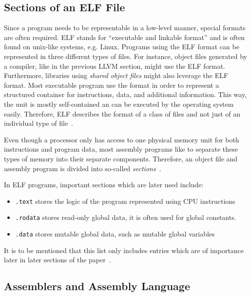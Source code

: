 \subsection{Sections of an ELF File}
Since a program needs to be representable in a low-level manner, special formats are often required.
ELF stands for \enquote{executable and linkable format} and is often found on unix-like systems, e.g. Linux.
Programs using the ELF format can be represented in three different types of files.
For instance, object files generated by a compiler, like in the previous LLVM section, might use the ELF format.
Furthermore, libraries using \emph{shared object files} might also leverage the ELF format.
Most executable program use the format in order to represent a structured container for instructions, data, and additional information.
This way, the unit is mostly self-contained an can be executed by the operating system easily.
Therefore, ELF describes the format of a class of files and not just of an individual type of file~\cite[p.~74-76]{Zhirkov2017-wk}.

Even though a processor only has access to one physical memory unit for both instructions and program data,
most assembly programs like to separate these types of memory into their separate components.
Therefore, an object file and assembly program is divided into so-called \emph{sections}~\cite[p.~19]{Zhirkov2017-wk}.

In ELF programs, important sections which are later used include:
\begin{itemize}
	\item \texttt{.text} stores the logic of the program represented using CPU instructions
	\item \texttt{.rodata} stores read-only global data, it is often used for global constants.
	\item \texttt{.data} stores mutable global data, such as mutable global variables
\end{itemize}

It is to be mentioned that this list only includes entries which are of importance later in later sections of the paper~\cite[p.~76]{Zhirkov2017-wk}.

\subsection{Assemblers and Assembly Language}

